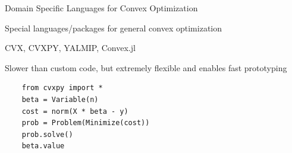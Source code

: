 \documentclass{beamer}
\begin{document}
\begin{frame}[fragile]{Domain Specific Languages for Convex Optimization}
	\BIT
\item Special languages/packages for general convex optimization
	\item CVX, CVXPY, YALMIP, Convex.jl
	\item Slower than custom code, but extremely flexible and
enables fast prototyping
	\EIT
	
	\pause
	\begin{verbatim}
	from cvxpy import *
	beta = Variable(n)
	cost = norm(X * beta - y)
	prob = Problem(Minimize(cost))
	prob.solve()
	beta.value
	\end{verbatim}
\end{frame}

\end{document}
